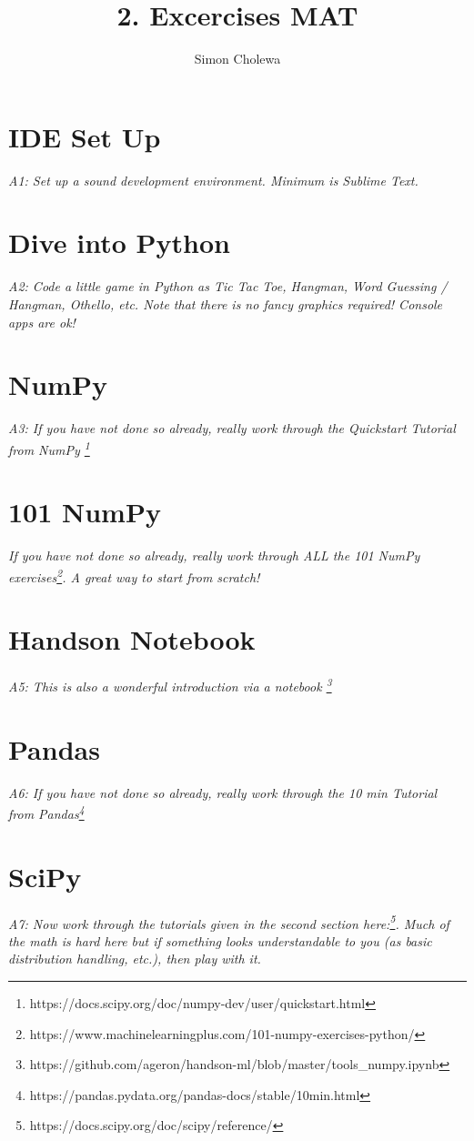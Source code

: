 \documentclass[11pt,a4paper]{article}
\author{Simon Cholewa}
\title{2. Excercises MAT}
\begin{document}
\maketitle

\section{IDE Set Up}
\textit{A1: Set up a sound development environment. Minimum is Sublime Text.}

\section{Dive into Python}
\textit{A2: Code a little game in Python as Tic Tac Toe, Hangman, Word Guessing / Hangman, Othello, etc. Note that there is no fancy graphics required! Console apps are ok!}

\section{NumPy}
\textit{A3: If you have not done so already, really work through the Quickstart Tutorial from NumPy \footnote{https://docs.scipy.org/doc/numpy-dev/user/quickstart.html}}

\section{101 NumPy}
\textit{If you have not done so already, really work through ALL the 101 NumPy exercises\footnote{https://www.machinelearningplus.com/101-numpy-exercises-python/}. A great way to start from scratch!}

\section{Handson Notebook}
\textit{A5: This is also a wonderful introduction via a notebook \footnote{https://github.com/ageron/handson-ml/blob/master/tools\_numpy.ipynb}}

\section{Pandas}
\textit{A6: If you have not done so already, really work through the 10 min Tutorial from Pandas\footnote{https://pandas.pydata.org/pandas-docs/stable/10min.html}}

\section{SciPy}
\textit{A7: Now work through the tutorials given in the second section here:\footnote{https://docs.scipy.org/doc/scipy/reference/}. Much of the math is hard here but if something looks understandable to you (as basic distribution handling, etc.), then play with it.}
\end{document}
